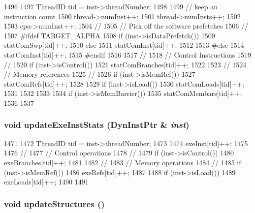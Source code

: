 \begin{DoxyCode}
1496 {
1497     ThreadID tid = inst->threadNumber;
1498 
1499     // keep an instruction count
1500     thread->numInst++;
1501     thread->numInsts++;
1502 
1503     cpu->numInst++;
1504     //
1505     //  Pick off the software prefetches
1506     //
1507 #ifdef TARGET_ALPHA
1508     if (inst->isDataPrefetch()) {
1509         statComSwp[tid]++;
1510     } else {
1511         statComInst[tid]++;
1512     }
1513 #else
1514     statComInst[tid]++;
1515 #endif
1516 
1517     //
1518     //  Control Instructions
1519     //
1520     if (inst->isControl())
1521         statComBranches[tid]++;
1522 
1523     //
1524     //  Memory references
1525     //
1526     if (inst->isMemRef()) {
1527         statComRefs[tid]++;
1528 
1529         if (inst->isLoad()) {
1530             statComLoads[tid]++;
1531         }
1532     }
1533 
1534     if (inst->isMemBarrier()) {
1535         statComMembars[tid]++;
1536     }
1537 }
\end{DoxyCode}
\hypertarget{classLWBackEnd_a132db67a5c42af856da64e347e8284d8}{
\subsubsection[{updateExeInstStats}]{\setlength{\rightskip}{0pt plus 5cm}void updateExeInstStats ({\bf DynInstPtr} \& {\em inst})}}
\label{classLWBackEnd_a132db67a5c42af856da64e347e8284d8}



\begin{DoxyCode}
1471 {
1472     ThreadID tid = inst->threadNumber;
1473 
1474     exeInst[tid]++;
1475 
1476     //
1477     //  Control operations
1478     //
1479     if (inst->isControl())
1480         exeBranches[tid]++;
1481 
1482     //
1483     //  Memory operations
1484     //
1485     if (inst->isMemRef()) {
1486         exeRefs[tid]++;
1487 
1488         if (inst->isLoad())
1489             exeLoads[tid]++;
1490     }
1491 }
\end{DoxyCode}
\hypertarget{classLWBackEnd_a1107d388cfcea92a9043608346ce98f0}{
\subsubsection[{updateStructures}]{\setlength{\rightskip}{0pt plus 5cm}void updateStructures ()}}
\label{classLWBackEnd_a1107d388cfcea92a9043608346ce98f0}



